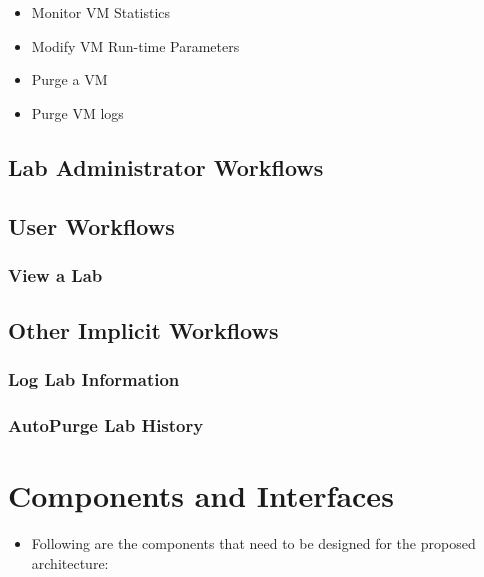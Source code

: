 \documentclass[11pt]{article}
\begin{document}
\begin{itemize}
\item Monitor VM Statistics\\
\label{sec-3.6.8}


\item Modify VM Run-time Parameters\\
\label{sec-3.6.9}


\item Purge a VM\\
\label{sec-3.6.10}


\item Purge VM logs\\
\label{sec-3.6.11}

\end{itemize} %
\subsection{Lab Administrator Workflows}
\label{sec-3.6}

\subsection{User Workflows}
\label{sec-3.7}

\subsubsection{View a Lab}
\label{sec-3.7.1}

\subsection{Other Implicit Workflows}
\label{sec-3.8}

\subsubsection{Log Lab Information}
\label{sec-3.8.1}

\subsubsection{AutoPurge Lab History}
\label{sec-3.8.2}


\section{Components and Interfaces}
\label{sec-4}

\begin{itemize}
\item Following are the components that need to be designed for the proposed architecture:
\end{itemize}
\end{document}
